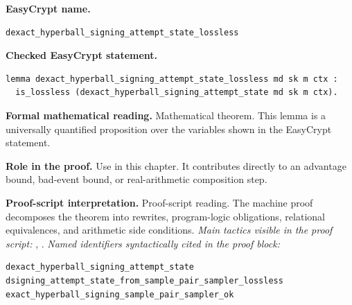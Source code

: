 \begin{formaltheorem}
\noindent\textbf{EasyCrypt name.}
\begin{lstlisting}[language=EasyCrypt,basicstyle=\ttfamily\scriptsize]
dexact_hyperball_signing_attempt_state_lossless
\end{lstlisting}
\noindent\textbf{Checked EasyCrypt statement.}
\begin{lstlisting}[language=EasyCrypt,basicstyle=\ttfamily\scriptsize]
lemma dexact_hyperball_signing_attempt_state_lossless md sk m ctx :
  is_lossless (dexact_hyperball_signing_attempt_state md sk m ctx).
\end{lstlisting}
\noindent\textbf{Formal mathematical reading.}
Mathematical theorem. This lemma is a universally quantified proposition over the variables shown in the EasyCrypt statement.

\noindent\textbf{Role in the proof.}
Use in this chapter. It contributes directly to an advantage bound, bad-event bound, or real-arithmetic composition step.

\noindent\textbf{Proof-script interpretation.}
Proof-script reading. The machine proof decomposes the theorem into rewrites, program-logic obligations, relational equivalences, and arithmetic side conditions.
\emph{Main tactics visible in the proof script:} , .
\emph{Named identifiers syntactically cited in the proof block:}
\begin{lstlisting}[language=EasyCrypt,basicstyle=\ttfamily\scriptsize]
dexact_hyperball_signing_attempt_state
dsigning_attempt_state_from_sample_pair_sampler_lossless
exact_hyperball_signing_sample_pair_sampler_ok
\end{lstlisting}

\end{formaltheorem}

